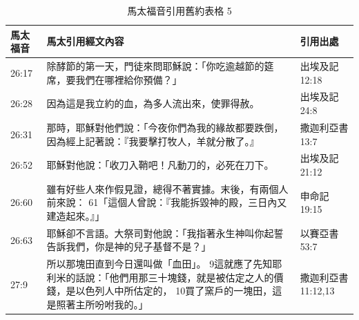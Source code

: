 \begin{table}[htbp]
  \centering
  \begin{tabular}{|p{4.2em}|p{31.645em}|p{7.3em}|}
    \toprule
    \rowcolor[rgb]{ .749,  .749,  .749} \textcolor[rgb]{ .267,  .447,  .769}{\textbf{馬太福音}} 
    & \textcolor[rgb]{ .267,  .447,  .769}{\textbf{馬太引用經文內容}} 
    & \textcolor[rgb]{ .267,  .447,  .769}{\textbf{引用出處}} \\
  
    \midrule
    26:17 & 除酵節的第一天，門徒來問耶穌說：「你吃逾越節的筵席，要我們在哪裡給你預備？」 & 出埃及記 12:18 \\
    \midrule
    26:28 & 因為這是我立約的血，為多人流出來，使罪得赦。 & 出埃及記 24:8 \\
    \midrule
    26:31 & 那時，耶穌對他們說：「今夜你們為我的緣故都要跌倒，因為經上記著說：『我要擊打牧人，羊就分散了。』 & 撒迦利亞書 13:7 \\
    \midrule
    26:52 & 耶穌對他說：「收刀入鞘吧！凡動刀的，必死在刀下。 & 出埃及記 21:12 \\
    \midrule
    26:60 & 雖有好些人來作假見證，總得不著實據。末後，有兩個人前來說： 61「這個人曾說：『我能拆毀神的殿，三日內又建造起來。』」 & 申命記 19:15 \\
    \midrule
    26:63 & 耶穌卻不言語。大祭司對他說：「我指著永生神叫你起誓告訴我們，你是神的兒子基督不是？」 & 以賽亞書 53:7 \\
    \midrule
    27:9  & 所以那塊田直到今日還叫做「血田」。 9這就應了先知耶利米的話說：「他們用那三十塊錢，就是被估定之人的價錢，是以色列人中所估定的， 10買了窯戶的一塊田，這是照著主所吩咐我的。」 & 撒迦利亞書 11:12,13 \\
    \bottomrule
    \end{tabular}%
  \label{tab:addlabel}%
 \caption{馬太福音引用舊約表格 5}  
\end{table}%





